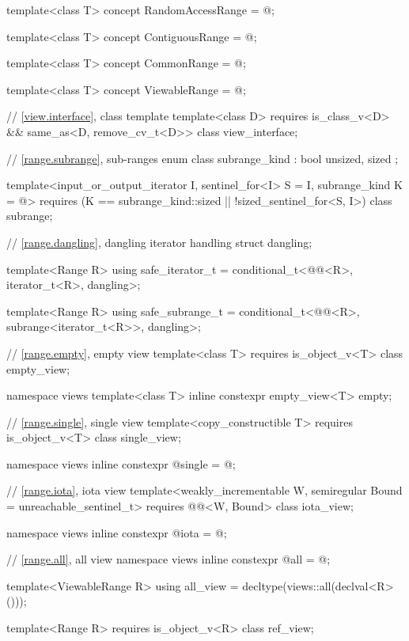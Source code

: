 \begin{codeblock}
{  template<class T>
    concept RandomAccessRange = @\seebelow@;

  template<class T>
    concept ContiguousRange = @\seebelow@;

  template<class T>
    concept CommonRange = @\seebelow@;

  template<class T>
    concept ViewableRange = @\seebelow@;

  // \ref{view.interface}, class template 
  template<class D>
    requires is_class_v<D> && same_as<D, remove_cv_t<D>>
  class view_interface;

  // \ref{range.subrange}, sub-ranges
  enum class subrange_kind : bool { unsized, sized };

  template<input_or_output_iterator I, sentinel_for<I> S = I, subrange_kind K = @\seebelow@>
    requires (K == subrange_kind::sized || !sized_sentinel_for<S, I>)
  class subrange;

  // \ref{range.dangling}, dangling iterator handling
  struct dangling;

  template<Range R>
    using safe_iterator_t = conditional_t<@@<R>, iterator_t<R>, dangling>;

  template<Range R>
    using safe_subrange_t =
      conditional_t<@@<R>, subrange<iterator_t<R>>, dangling>;

  // \ref{range.empty}, empty view
  template<class T>
    requires is_object_v<T>
  class empty_view;

  namespace views {
    template<class T>
      inline constexpr empty_view<T> empty{};
  }

  // \ref{range.single}, single view
  template<copy_constructible T>
    requires is_object_v<T>
  class single_view;

  namespace views { inline constexpr @\unspec@ single = @\unspec@; }

  // \ref{range.iota}, iota view
  template<weakly_incrementable W, semiregular Bound = unreachable_sentinel_t>
    requires @@<W, Bound>
  class iota_view;

  namespace views { inline constexpr @\unspec@ iota = @\unspec@; }

  // \ref{range.all}, all view
  namespace views { inline constexpr @\unspec@ all = @\unspec@; }

  template<ViewableRange R>
    using all_view = decltype(views::all(declval<R>()));

  template<Range R>
    requires is_object_v<R>
  class ref_view;

}
\end{codeblock}
